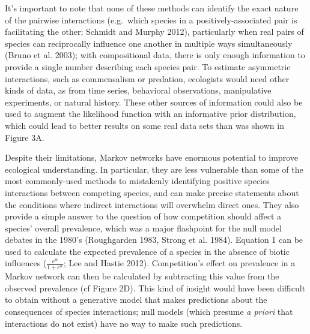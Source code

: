 \documentclass[12pt,]{article}
\begin{document}
\begin{spacing}{1.9}
\begin{flushleft}
It's important to note that none of these methods can identify the exact
nature of the pairwise interactions (e.g.~which species in a
positively-associated pair is facilitating the other; Schmidt and Murphy
2012), particularly when real pairs of species can reciprocally
influence one another in multiple ways simultaneously (Bruno et al.
2003); with compositional data, there is only enough information to
provide a single number describing each species pair. To estimate
asymmetric interactions, such as commensalism or predation, ecologists
would need other kinds of data, as from time series, behavioral
observations, manipulative experiments, or natural history. These other
sources of information could also be used to augment the likelihood
function with an informative prior distribution, which could lead to
better results on some real data sets than was shown in Figure 3A.

Despite their limitations, Markov networks have enormous potential to
improve ecological understanding. In particular, they are less
vulnerable than some of the most commonly-used methods to mistakenly
identifying positive species interactions between competing species, and
can make precise statements about the conditions where indirect
interactions will overwhelm direct ones. They also provide a simple
answer to the question of how competition should affect a species'
overall prevalence, which was a major flashpoint for the null model
debates in the 1980's (Roughgarden 1983, Strong et al. 1984). Equation 1
can be used to calculate the expected prevalence of a species in the
absence of biotic influences (\(\frac{e^\alpha}{1 + e^{\alpha}}\); Lee
and Hastie 2012). Competition's effect on prevalence in a Markov network
can then be calculated by subtracting this value from the observed
prevalence (cf Figure 2D). This kind of insight would have been
difficult to obtain without a generative model that makes predictions
about the consequences of species interactions; null models (which
presume \emph{a priori} that interactions do not exist) have no way to
make such predictions.


\end{flushleft}
\end{spacing}
\end{document}
